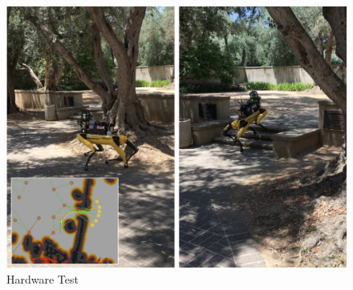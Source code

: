 \documentclass{article}
\begin{document}
\begin{figure}[t!]
  \centering
  \includegraphics[width=.6\textwidth]{figures/spot_garden_test.png}
  \caption{Hardware Test}
  \label{fig:spot-garden}
\end{figure}
\end{document}

